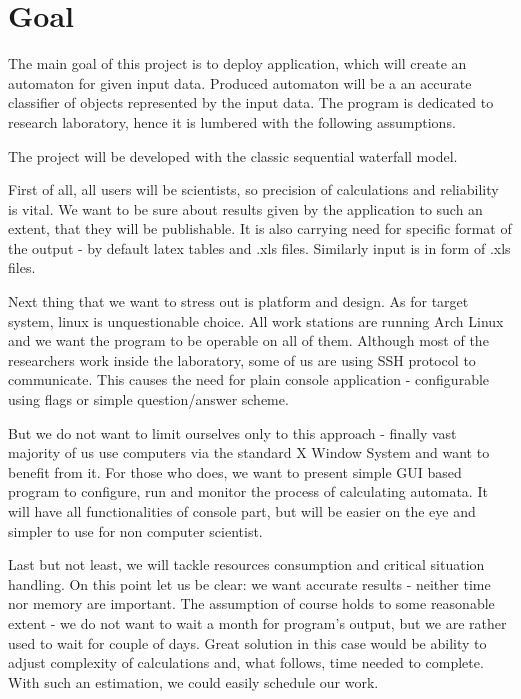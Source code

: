 \documentclass{article}
\begin{document}

\section{Goal}
The main goal of this project is to deploy application, which will create an automaton for given input data. Produced automaton will be a an accurate classifier of objects represented
by the input data. The program is dedicated to research laboratory, hence it is lumbered with the following assumptions.

The project will be developed with the classic sequential waterfall model.

First of all, all users will be scientists, so precision of calculations and reliability is vital. We want to be sure about results given by the application to such an extent, that they will be publishable. It is also carrying need for specific format of the output - by default latex tables and .xls files. Similarly input is in form of .xls files.


Next thing that we want to stress out is platform and design. As for target system, linux is unquestionable choice. All work stations are running Arch Linux and we want the program to be operable on all of them. Although most of the researchers work inside the laboratory, some of us are using SSH protocol to communicate. This causes the need for plain console application - configurable using flags or simple question/answer scheme. 

But we do not want to limit ourselves only to this approach - finally vast majority of us use computers via the standard X Window System and want to benefit from it. For those who does, we want to present simple GUI based program to configure, run and monitor the process of calculating automata. It will have all functionalities of console part, but will be easier on the eye and simpler to use for non computer scientist.


Last but not least, we will tackle resources consumption and critical situation handling. On this point let us be clear: we want accurate results - neither time nor memory are important. The assumption of course holds to some reasonable extent - we do not want to wait a month for program's output, but we are rather used to wait for couple of days. Great solution in this case would be ability to adjust complexity of calculations and, what follows, time needed to complete. With such an estimation, we could easily schedule our work.
\end{document}
